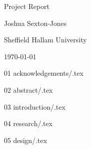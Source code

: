 \documentclass{report}
\begin{document}
\begin{titlepage}
  \begin{center}
    \setlength\parskip{1ex}

    \null

    \vfill

    { \huge Project Report }

    Joshua Sexton-Jones

    \vfill

    Sheffield Hallam University

    \today \end{center} \end{titlepage}


{01 acknowledgements/.tex} \clearpage


{02 abstract/.tex} \clearpage

\tableofcontents \clearpage

\printglossary[title=Terminology] \clearpage

\cite{hmm}


{03 introduction/.tex} \clearpage


{04 research/.tex} \clearpage


{05 design/.tex} \clearpage

\printbibliography \clearpage
\end{document}
